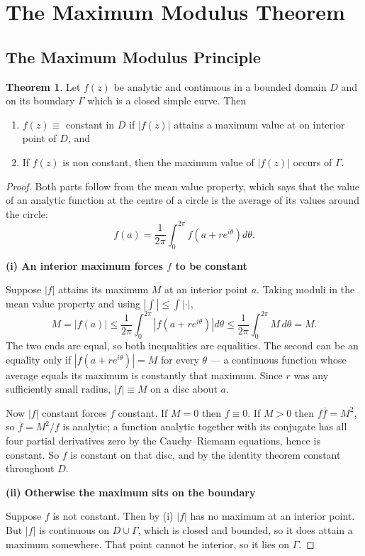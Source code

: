 \documentclass[11pt,a4paper]{article}
\theoremstyle{definition}
\newtheorem{thm}{Theorem}[section]
\newcommand{\subhead}[1]{%
  \par\medskip\noindent\textbf{#1}\par\nobreak\smallskip}
\begin{document}
\pagebreak
{\color[wave]{485}\section{The Maximum Modulus Theorem}}



{\color[wave]{485}\subsection{The Maximum Modulus Principle}}
\begin{thm}
Let $f(z)$ be analytic and continuous in a bounded domain $D$ and on its boundary $\Gamma$ which is a closed simple curve. Then
\begin{enumerate}
\item[(i).] $f(z)\equiv$ constant in $D$ if $\left|f(z)\right|$ attains a maximum value at on interior point of $D$, and 
\item[(ii).] If $f(z)$ is non constant, then the maximum value of $\left|f(z)\right|$ occurs of $\Gamma$.\\
\end{enumerate}
\end{thm}


\begin{proof}
Both parts follow from the mean value property, which says that the value of an
analytic function at the centre of a circle is the average of its values around
the circle:
$$f(a)=\frac{1}{2\pi}\int_0^{2\pi}f\!\left(a+re^{i\theta}\right)d\theta .$$

\subhead{(i) An interior maximum forces $f$ to be constant}
Suppose $\left|f\right|$ attains its maximum $M$ at an interior point $a$.
Taking moduli in the mean value property and using
$\left|\int\right|\leq\int\left|\cdot\right|$,
$$M=\left|f(a)\right|\leq\frac{1}{2\pi}\int_0^{2\pi}
\left|f\!\left(a+re^{i\theta}\right)\right|d\theta\leq
\frac{1}{2\pi}\int_0^{2\pi}M\,d\theta=M .$$
The two ends are equal, so both inequalities are equalities. The second can be
an equality only if $\left|f\!\left(a+re^{i\theta}\right)\right|=M$ for every
$\theta$ --- a continuous function whose average equals its maximum is
constantly that maximum. Since $r$ was any sufficiently small radius,
$\left|f\right|\equiv M$ on a disc about $a$.

Now $\left|f\right|$ constant forces $f$ constant. If $M=0$ then $f\equiv 0$.
If $M>0$ then $f\overline{f}=M^2$, so $\overline{f}=M^2/f$ is analytic; a
function analytic together with its conjugate has all four partial derivatives
zero by the Cauchy--Riemann equations, hence is constant. So $f$ is constant on
that disc, and by the identity theorem constant throughout $D$.

\subhead{(ii) Otherwise the maximum sits on the boundary}
Suppose $f$ is not constant. Then by (i) $\left|f\right|$ has no maximum at an
interior point. But $\left|f\right|$ is continuous on $D\cup\Gamma$, which is
closed and bounded, so it does attain a maximum somewhere. That point cannot be
interior, so it lies on $\Gamma$.
\end{proof}
\end{document}
